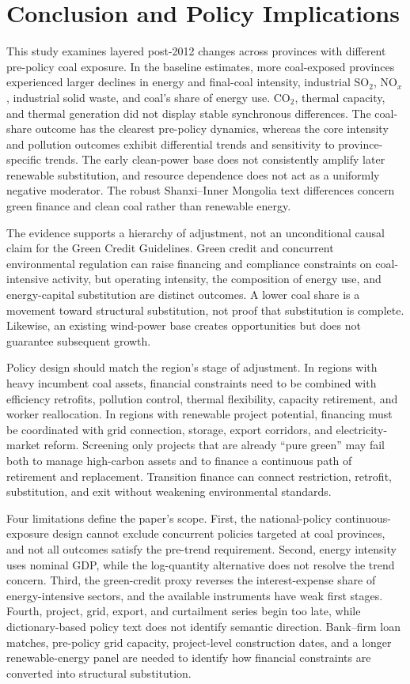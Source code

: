 \documentclass[11pt]{article}
\begin{document}
\section{Conclusion and Policy Implications}

This study examines layered post-2012 changes across provinces with different pre-policy coal exposure. In the baseline estimates, more coal-exposed provinces experienced larger declines in energy and final-coal intensity, industrial SO$_2$, NO$_x$, industrial solid waste, and coal's share of energy use. CO$_2$, thermal capacity, and thermal generation did not display stable synchronous differences. The coal-share outcome has the clearest pre-policy dynamics, whereas the core intensity and pollution outcomes exhibit differential trends and sensitivity to province-specific trends. The early clean-power base does not consistently amplify later renewable substitution, and resource dependence does not act as a uniformly negative moderator. The robust Shanxi--Inner Mongolia text differences concern green finance and clean coal rather than renewable energy.

The evidence supports a hierarchy of adjustment, not an unconditional causal claim for the Green Credit Guidelines. Green credit and concurrent environmental regulation can raise financing and compliance constraints on coal-intensive activity, but operating intensity, the composition of energy use, and energy-capital substitution are distinct outcomes. A lower coal share is a movement toward structural substitution, not proof that substitution is complete. Likewise, an existing wind-power base creates opportunities but does not guarantee subsequent growth.

Policy design should match the region's stage of adjustment. In regions with heavy incumbent coal assets, financial constraints need to be combined with efficiency retrofits, pollution control, thermal flexibility, capacity retirement, and worker reallocation. In regions with renewable project potential, financing must be coordinated with grid connection, storage, export corridors, and electricity-market reform. Screening only projects that are already ``pure green'' may fail both to manage high-carbon assets and to finance a continuous path of retirement and replacement. Transition finance can connect restriction, retrofit, substitution, and exit without weakening environmental standards.

Four limitations define the paper's scope. First, the national-policy continuous-exposure design cannot exclude concurrent policies targeted at coal provinces, and not all outcomes satisfy the pre-trend requirement. Second, energy intensity uses nominal GDP, while the log-quantity alternative does not resolve the trend concern. Third, the green-credit proxy reverses the interest-expense share of energy-intensive sectors, and the available instruments have weak first stages. Fourth, project, grid, export, and curtailment series begin too late, while dictionary-based policy text does not identify semantic direction. Bank--firm loan matches, pre-policy grid capacity, project-level construction dates, and a longer renewable-energy panel are needed to identify how financial constraints are converted into structural substitution.
\end{document}
